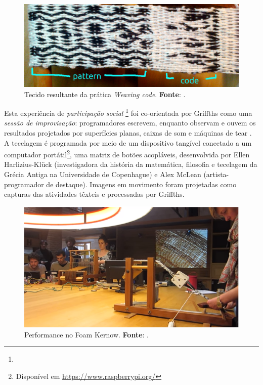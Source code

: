 \begin{figure}[!h]
    \centering
    \includegraphics[scale=0.31]{imagens/weaving.jpg}
    \caption{Tecido resultante da prática \emph{Weaving code}. \textbf{Fonte}: .}
  \label{fig:weaving}
\end{figure}

Esta experiência de \emph{participação social} \footnote{} foi co-orientada por Griffths como uma \emph{sessão de improvisação}: programadores escrevem, enquanto observam e ouvem os resultados projetados por superfícies planas, caixas de som e máquinas de tear . A tecelagem é programada por meio de um dispositivo tangível  conectado a um computador portátil\footnote{Disponível em \url{https://www.raspberrypi.org/}}, uma matriz de botões acopláveis, desenvolvida por Ellen Harlizius-Klück (investigadora da história da matemática, filosofia e tecelagem da Grécia Antiga na Universidade de Copenhague) e Alex McLean (artista-programador de destaque). Imagens em movimento foram projetadas como capturas das atividades têxteis e processadas por Griffths. 

\begin{figure}[h]
  \centering
  \includegraphics[scale=0.64]{imagens/weaving.png}
  \caption{Performance no Foam Kernow. \textbf{Fonte}: .}
  \label{fig:weavecoding}
\end{figure}

